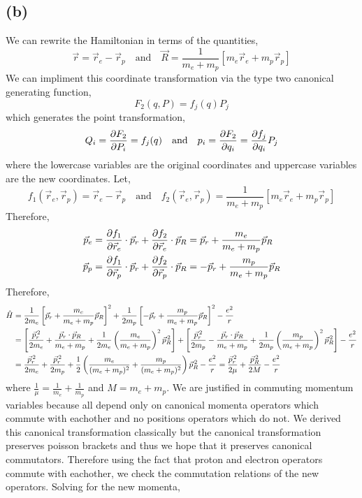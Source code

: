 \documentclass[12pt]{extarticle}
\begin{document}
\subsection*{(b)}

We can rewrite the Hamiltonian in terms of the quantities,
\[\vec{r} = \vec{r}_e - \vec{r}_p \quad \text{and} \quad \vec{R} = \frac{1}{m_e + m_p} \left[ m_e \vec{r}_e + m_p \vec{r}_p \right] \]
We can impliment this coordinate transformation via the type two canonical generating function,
\[F_2(q, P) = f_j(q) P_j\] 
which generates the point transformation,
\[Q_i = \frac{\partial{F_2}}{\partial{P_i}} = f_j(q) \quad \text{and} \quad p_i = \frac{\partial{F_2}}{\partial{q_i}} = \frac{\partial{f_j}}{\partial{q_i}} P_j\]
where the lowercase variables are the original coordinates and uppercase variables are the new coordinates. Let,
\[f_1(\vec{r}_e, \vec{r}_p) = \vec{r}_e - \vec{r}_p \quad \text{and} \quad f_2(\vec{r}_e, \vec{r}_p) = \frac{1}{m_e + m_p} \left[ m_e \vec{r}_e + m_p \vec{r}_p \right]\]
Therefore, 
\begin{align*}
\vec{p}_e &= \frac{\partial{f_1}}{\partial{\vec{r}_e}} \cdot \vec{p}_r + \frac{\partial{f_2}}{\partial{\vec{r}_e}} \cdot \vec{p}_R = \vec{p}_r + \frac{m_e}{m_e + m_p} \vec{p}_R  \\
\vec{p}_p &= \frac{\partial{f_1}}{\partial{\vec{r}_p}} \cdot \vec{p}_r + \frac{\partial{f_2}}{\partial{\vec{r}_p}} \cdot \vec{p}_R = - \vec{p}_r + \frac{m_p}{m_e + m_p} \vec{p}_R 
\end{align*}
Therefore,
\begin{align*}
\hat{H} & = \frac{1}{2m_e} \left[ \vec{p}_r + \frac{m_e}{m_e + m_p} \vec{p}_R  \right]^2 + \frac{1}{2m_p} \left[- \vec{p}_r + \frac{m_p}{m_e + m_p} \vec{p}_R \right]^2 - \frac{e^2}{r} \\
& =  \left[ \frac{\vec{p}_r^{\,2}}{2m_e} + \frac{\vec{p}_r \cdot \vec{p}_R}{m_e + m_p} +  \frac{1}{2m_e} \left(\frac{m_e}{m_e + m_p} \right)^2 \vec{p}_R^{\,2} \right] + \left[ \frac{\vec{p}_r^{\,2}}{2m_p} - \frac{\vec{p}_r \cdot \vec{p}_R}{m_e + m_p} +  \frac{1}{2m_p} \left(\frac{m_p}{m_e + m_p} \right)^2 \vec{p}_R^{\,2} \right] - \frac{e^2}{r} \\
& = \frac{\vec{p}_r^{\,2}}{2m_e} + \frac{\vec{p}_r^{\,2}}{2m_p} + \frac{1}{2} \left( \frac{m_e}{(m_e + m_p)^2} + \frac{m_p}{(m_e + m_p)^2} \right)\vec{p}_R^{\,2} - \frac{e^2}{r} = \frac{\vec{p}_r^{\,2}}{2 \mu} + \frac{\vec{p}_R^{\,2}}{2 M} - \frac{e^2}{r}
\end{align*}
where $\frac{1}{\mu} = \frac{1}{m_e} + \frac{1}{m_p}$ and $M = m_e + m_p$. We are justified in commuting momentum variables because all depend only on canonical momenta operators which commute with eachother and no positions operators which do not. We derived this canonical transformation classically but the canonical transformation preserves poisson brackets and thus we hope that it preserves canonical commutators. Therefore using the fact that proton and electron operators commute with eachother, we check the commutation relations of the new operators. Solving for the new momenta,
\end{document}
